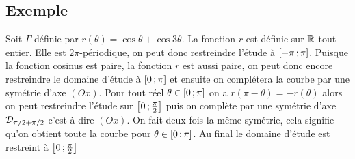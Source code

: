 \subsection{Exemple}

Soit \(\Gamma\) définie par \(r(\theta)=\cos \theta + \cos 3\theta\). La 
fonction \(r\) est définie sur \(\mathbb{R}\) tout entier. Elle est 
\(2\pi\)-périodique, on peut donc restreindre l'étude à 
\(\left[ -\pi \, ; {} \pi \right]\). Puisque la fonction cosinus est paire, la 
fonction \(r\) est aussi paire, on peut donc encore restreindre le domaine 
d'étude à \(\left[ 0 \, ; {} \pi \right]\) et ensuite on complétera la courbe par une 
symétrie d'axe \((Ox)\). Pour tout réel \(\theta \in \left[ 0 \, ; {} \pi \right]\) 
on a \(r(\pi-\theta)=-r(\theta)\) alors on peut restreindre l'étude sur 
\(\left[ 0 \, ; {} \frac{\pi}{2} \right]\) puis on complète par une symétrie d'axe 
\(\mathcal{D}_{\pi/2 + \pi/2}\) c'est-à-dire \((Ox)\). On fait deux fois la même 
symétrie, cela signifie qu'on obtient toute la courbe pour \(\theta \in 
\left[ 0 \, ; {} \pi \right]\). Au final le domaine d'étude est restreint à 
\(\left[ 0 \, ; {} \frac{\pi}{2} \right]\)

